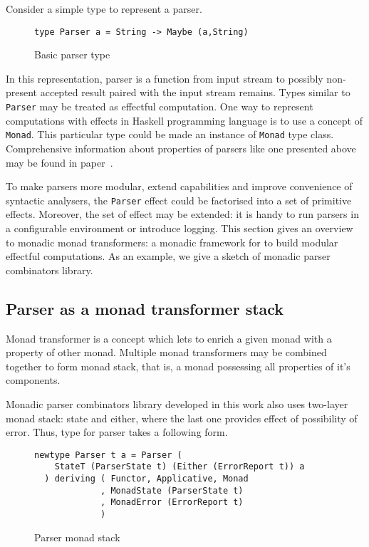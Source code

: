     Consider a simple type to represent a parser.

    \begin{figure}[h]
    \begin{lstlisting}
type Parser a = String -> Maybe (a,String)
    \end{lstlisting}
    \caption{Basic parser type}
    \label{listing:maybeParser}
    \end{figure}

    In this representation, parser is a
    function from input stream to possibly non-present accepted result paired
    with the input stream remains.
    Types similar to \texttt{Parser} may be treated as effectful computation.
    One way to represent computations with effects in Haskell
    programming language is to use a concept of \texttt{Monad}. This particular
    type could be made an instance of \texttt{Monad} type class.
    Comprehensive information about properties of parsers like one presented
    above may be found in paper~\cite{monParsing}.

    To make parsers more modular, extend capabilities and improve convenience of
    syntactic analysers, the \texttt{Parser} effect could be factorised into a set of
    primitive effects. Moreover, the set of effect may be extended: it is handy to
    run parsers in a configurable environment or introduce logging.
    This section gives an overview to monadic monad transformers: a monadic framework
    for to build modular effectful computations. As an example, we give a sketch of
    monadic parser combinators library.

    \subsection{Parser as a monad transformer stack}

      Monad transformer is a concept which lets to enrich a given monad with a
      property of other monad. Multiple monad transformers may be combined
      together to form monad stack, that is, a monad possessing all properties of
      it's components.

      Monadic parser combinators library developed in this work also uses two-layer monad
      stack: state and either,
      where the last one provides effect of possibility of error. Thus, type for parser
      takes a following form.

      \begin{figure}[h]
      \begin{lstlisting}
newtype Parser t a = Parser (
    StateT (ParserState t) (Either (ErrorReport t)) a
  ) deriving ( Functor, Applicative, Monad
             , MonadState (ParserState t)
             , MonadError (ErrorReport t)
             )
      \end{lstlisting}
      \caption{Parser monad stack}
      \label{listing:mtlParser}
      \end{figure}

